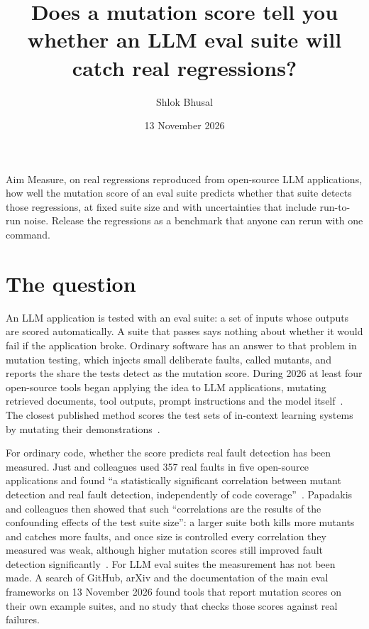 \documentclass[11pt]{article}
\title{Does a mutation score tell you whether an LLM eval suite will catch real regressions?}
\author{Shlok Bhusal}
\date{13 November 2026}
\begin{document}
\maketitle

\begin{statement}{Aim}
Measure, on real regressions reproduced from open-source LLM applications, how well the mutation score of an eval suite predicts whether that suite detects those regressions, at fixed suite size and with uncertainties that include run-to-run noise. Release the regressions as a benchmark that anyone can rerun with one command.
\end{statement}

\section{The question}

An LLM application is tested with an eval suite: a set of inputs whose outputs are scored automatically. A suite that passes says nothing about whether it would fail if the application broke. Ordinary software has an answer to that problem in mutation testing, which injects small deliberate faults, called mutants, and reports the share the tests detect as the mutation score. During 2026 at least four open-source tools began applying the idea to LLM applications, mutating retrieved documents, tool outputs, prompt instructions and the model itself~\cite{muteval,sabot,litmus,clastogen}. The closest published method scores the test sets of in-context learning systems by mutating their demonstrations~\cite{Wei2024}.

For ordinary code, whether the score predicts real fault detection has been measured. Just and colleagues used 357 real faults in five open-source applications and found ``a statistically significant correlation between mutant detection and real fault detection, independently of code coverage''~\cite{Just2014}. Papadakis and colleagues then showed that such ``correlations are the results of the confounding effects of the test suite size'': a larger suite both kills more mutants and catches more faults, and once size is controlled every correlation they measured was weak, although higher mutation scores still improved fault detection significantly~\cite{Papadakis2018}. For LLM eval suites the measurement has not been made. A search of GitHub, arXiv and the documentation of the main eval frameworks on 13 November 2026 found tools that report mutation scores on their own example suites, and no study that checks those scores against real failures.
\end{document}
